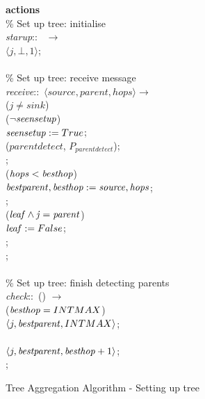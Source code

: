 \begin{figure}[H]
  \centering
  \begin{boxedminipage}{\linewidth}
    \null \textbf{actions}\\
    \null\qq \% Set up tree: initialise\\
    \null\qq \emph{starup}::~ $\rightarrow$\\
    \null\qq\qq {}$\langle j, \bot, 1\rangle$;\\~\\
    \null\qq \% Set up tree: receive message\\
    \null\qq \emph{receive}::~$\langle source, parent, hops\rangle \rightarrow$\\
    \null\qq\qq {} ($j \not= sink$)  \\
    \null\qq\qq\qq {} ($\lnot\mbox{\emph{seensetup}}$)  \\
    \null\qq\qq\qq\qq $\mbox{\emph{seensetup}} \mathrel{:=} True$; \\
    \null\qq\qq\qq\qq {}($\mathit{parentdetect}$, $P_{parentdetect}$); \\
    \null\qq\qq\qq {}; \\
    \null\qq\qq\qq {} ($\mbox{\emph{hops}} < \mbox{\emph{besthop}}$)  \\
    \null\qq\qq\qq\qq $\mbox{\emph{bestparent}}, \mbox{\emph{besthop}} \mathrel{:=} \mbox{\emph{source}}, \mbox{\emph{hops}}$; \\
    \null\qq\qq\qq {}; \\
    \null\qq\qq\qq {} ($\mbox{\emph{leaf}} \land \mbox{\emph{j}} = \mbox{\emph{parent}}$)  \\
    \null\qq\qq\qq\qq $\mbox{\emph{leaf}} \mathrel{:=} False$; \\
    \null\qq\qq\qq {}; \\
    \null\qq\qq {}; \\~\\
    \null\qq \% Set up tree: finish detecting parents\\
    \null\qq \emph{check}::~() $\rightarrow$\\
    \null\qq\qq {} ($\mbox{\emph{besthop}} = INTMAX$)  \\
    \null\qq\qq\qq {}$\langle j, \mbox{\emph{bestparent}}, INTMAX\rangle$;\\
    \null\qq\qq {} \\
    \null\qq\qq\qq {}$\langle j, \mbox{\emph{bestparent}}, \mbox{\emph{besthop}} + 1\rangle$;\\
    \null\qq\qq {}; \\
  \end{boxedminipage}
  \caption{Tree Aggregation Algorithm - Setting up tree}
\end{figure}


